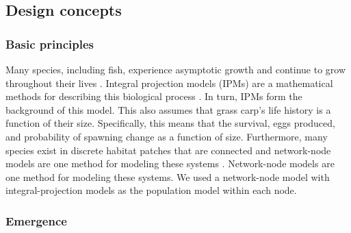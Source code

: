 \documentclass{article}[12pt]
\begin{document}



\subsection{Design concepts}

\subsubsection{Basic principles}\label{sec:bp}

Many species, including fish, experience asymptotic growth and continue to grow throughout their lives \citep{lagler1962john}.
Integral projection models (IPMs) are a mathematical methods for describing this biological process \citep{ellner2006integral, merow2014advancing}.
In turn, IPMs form the background of this model. 
This also assumes that grass carp's life history is a function of their size. 
Specifically, this means that the survival, eggs produced, and probability of spawning change as a function of size. 
Furthermore, many species exist in discrete habitat patches that are connected and network-node models are one method for modeling these systems \citep[][]{wiederholt2017estimating, sample2017general, erickson2017defining, bieriGuide2018}.
Network-node models are one method for modeling these systems.
We used a network-node model with integral-projection models as the population model within each node. 

\subsubsection{Emergence}
\end{document}
